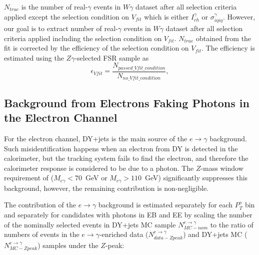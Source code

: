 $N_{true}$ is the number of real-$\gamma$ events in $W\gamma$ dataset after all selection criteria applied except the selection condition on $V_{fit}$ which is either $I_{ch}^{\gamma}$ or $\sigma_{i\eta i\eta}^{\gamma}$. However, our goal is to extract number of real-$\gamma$ events in $W\gamma$ dataset after all selection criteria applied including the selection condition on $V_{fit}$. $N_{true}$ obtained from the fit is corrected by the efficiency of the selection condition on $V_{fit}$. The efficiency is estimated using the $Z\gamma$-selected FSR sample as 
\begin{equation}
 \epsilon_{Vfit} = \frac{N_{passed\_Vfit\_condition}}{N_{no\_Vfit\_condition}},
\end{equation}


\subsection{Background from Electrons Faking Photons in the Electron Channel}
\label{sec:BackgroundSubtraction_etog}

For the electron channel, DY+jets is the main source of the $e \rightarrow \gamma$ background. Such misidentification happens when an electron from DY is detected in the calorimeter, but the tracking system fails to find the electron, and therefore the calorimeter response is considered to be due to a photon. The $Z$-mass window requirement of ($M_{e\gamma}<70$~GeV or $M_{e\gamma}>110$~GeV) significantly suppresses this background, however, the remaining contribution is non-negligible. 

The contribution of the $e\rightarrow\gamma$ background is estimated separately for each $P_{T}^{\gamma}$ bin and separately for candidates with photons in EB and EE by scaling the number of the nominally selected events in DY+jets MC sample $N_{MC-nom}^{e\rightarrow\gamma}$ to the ratio of numbers of events in the  $e\rightarrow\gamma$-enriched data ($N_{data-Zpeak}^{e\rightarrow\gamma}$) and DY+jets MC ($N_{MC-Zpeak}^{e\rightarrow\gamma}$) samples under the $Z$-peak: 

